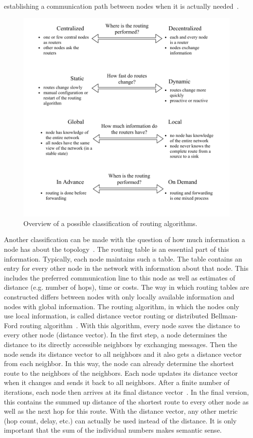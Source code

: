 \documentclass[english,version-2019-11]{uzl-thesis}
\begin{document}
establishing a communication path between nodes when
it is actually needed~\cite{Schiller}.
\begin{figure}[htpb]
  \centering
  \includegraphics[scale=0.9]{figure_routing_classification.pdf}
  \caption{Overview of a possible classification of routing algorithms.}
  \label{figure_routing_classification}
\end{figure}

Another classification can be made with the question
of how much information a node has about the topology~\cite{Kurose}.
The routing table is an essential part of this information.
Typically, each node maintains such a table.
The table contains an entry for every other node in the network
with information about that node.
This includes the preferred communication line to this node as well
as estimates of distance (e.g. number of hops), time or costs.
The way in which routing tables are constructed differs
between nodes with only locally available information and nodes
with global information. The routing algorithm, in which the nodes
only use local information, is called distance vector routing
or distributed Bellman-Ford routing algorithm~\cite{Tanenbaum}.
With this algorithm, every node saves the distance to every
other node (distance vector).
In the first step, a node determines the distance
to its directly accessible neighbors by exchanging messages.
Then the node sends its distance vector to all neighbors
and it also gets a distance vector from each neighbor.
In this way, the node can already determine the shortest
route to the neighbors of the neighbors.
Each node updates its distance vector when it changes
and sends it back to all neighbors. After a finite number
of iterations, each node then arrives at its final
distance vector~\cite{Tanenbaum}. In the final version, this contains
the summed up distance of the shortest route to
every other node as well as the next hop for
this route. With the distance vector, any other
metric (hop count, delay, etc.) can actually
be used instead of the distance. It is only important
that the sum of the individual numbers
makes semantic sense.
\end{document}

